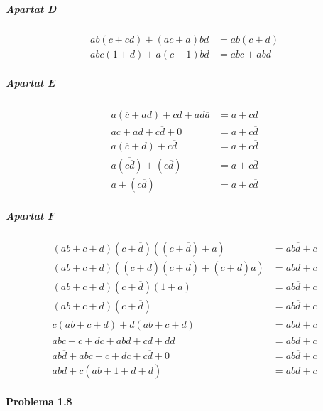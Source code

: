 \subparagraph{Apartat D} \begin{align*}
  ab\left(c + cd\right) + \left(ac + a\right)bd &= ab\left(c + d\right) \\
  abc\left(1 + d\right) + a\left(c + 1\right)bd &= abc + abd
\end{align*}

\subparagraph{Apartat E} \begin{align*}
  a\left(\overline{c} + ad\right) + c\overline{d} + ad\overline{a} &= a + c\overline{d} \\
  a\overline{c} + ad + c\overline{d} + 0 &= a + c\overline{d} \\
  a\left(\overline{c} + d\right) + c\overline{d} &= a + c\overline{d} \\
  a\overline{\left(c\overline{d}\right)} + \left(c\overline{d}\right) &= a + c\overline{d} \\
  a + \left(c\overline{d}\right) &= a + c\overline{d}
\end{align*}

\subparagraph{Apartat F} \begin{align*}
  \left(ab + c + d\right)\left(c + \overline{d}\right)\left(\left(c + \overline{d}\right) + a\right) &= ab\overline{d} + c \\
  \left(ab + c + d\right)\left(\left(c + \overline{d}\right)\left(c + \overline{d}\right) + \left(c + \overline{d}\right)a\right) &= ab\overline{d} + c \\
  \left(ab + c + d\right)\left(c + \overline{d}\right)\left(1 + a\right) &= ab\overline{d} + c \\
  \left(ab + c + d\right)\left(c + \overline{d}\right) &= ab\overline{d} + c \\
  c\left(ab + c + d\right) + \overline{d}\left(ab + c + d\right) &= ab\overline{d} + c \\
  abc + c + dc + ab\overline{d} + c\overline{d} + d\overline{d} &= ab\overline{d} + c \\
  ab\overline{d} + abc + c + dc + c\overline{d} + 0 &= ab\overline{d} + c \\
  ab\overline{d} + c\left(ab + 1 + d + \overline{d}\right) &= ab\overline{d} + c
\end{align*}

\finishpage


\page
\paragraph{Problema 1.8}

